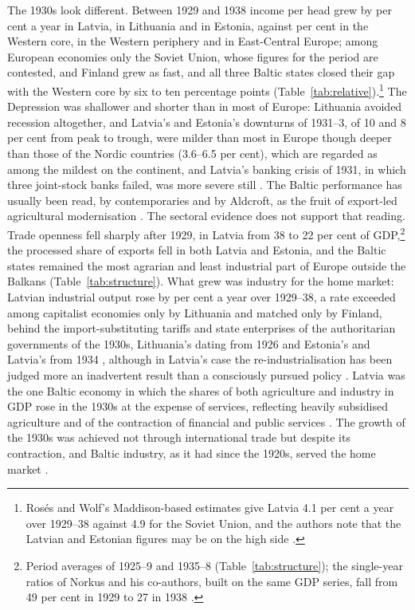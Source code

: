 The 1930s look different. Between 1929 and 1938 income per head grew by  per cent a year in Latvia,  in Lithuania and  in Estonia, against  per cent in the Western core,  in the Western periphery and  in East-Central Europe; among European economies only the Soviet Union, whose figures for the period are contested, and Finland grew as fast, and all three Baltic states closed their gap with the Western core by six to ten percentage points (Table~\ref{tab:relative}).\footnote{Rosés and Wolf's Maddison-based estimates give Latvia 4.1 per cent a year over 1929--38 against 4.9 for the Soviet Union, and the authors note that the Latvian and Estonian figures may be on the high side \parencite[188, 190]{roseswolf2010}.} The Depression was shallower and shorter than in most of Europe: Lithuania avoided recession altogether, and Latvia's and Estonia's downturns of 1931--3, of 10 and 8 per cent from peak to trough, were milder than most in Europe though deeper than those of the Nordic countries (3.6--6.5 per cent), which are regarded as among the mildest on the continent, and Latvia's banking crisis of 1931, in which three joint-stock banks failed, was more severe still \parencites[370, 372]{grytten_nordicdepression}[91]{bernankegd01}[236]{terleckaspinigai}. The Baltic performance has usually been read, by contemporaries and by Aldcroft, as the fruit of export-led agricultural modernisation \parencites[189]{balticstates1938}[119--20]{aldcrof1914}. The sectoral evidence does not support that reading. Trade openness fell sharply after 1929, in Latvia from 38 to 22 per cent of GDP,\footnote{Period averages of 1925--9 and 1935--8 (Table~\ref{tab:structure}); the single-year ratios of Norkus and his co-authors, built on the same GDP series, fall from 49 per cent in 1929 to 27 in 1938 \parencite[10]{norkus_2025_why}.} the processed share of exports fell in both Latvia and Estonia, and the Baltic states remained the most agrarian and least industrial part of Europe outside the Balkans (Table~\ref{tab:structure}). What grew was industry for the home market: Latvian industrial output rose by  per cent a year over 1929--38, a rate exceeded among capitalist economies only by Lithuania and matched only by Finland, behind the import-substituting tariffs and state enterprises of the authoritarian governments of the 1930s, Lithuania's dating from 1926 and Estonia's and Latvia's from 1934 \parencites[113--14, 116]{ehbaltics_tarvel}[134, 140]{karnups_2017_karla}, although in Latvia's case the re-industrialisation has been judged more an inadvertent result than a consciously pursued policy \parencite[11, 36]{Klimantas2024}. Latvia was the one Baltic economy in which the shares of both agriculture and industry in GDP rose in the 1930s at the expense of services, reflecting heavily subsidised agriculture \parencites[713, 835]{latvija19141945vesture}[135--6]{karnups_2017_karla} and of the contraction of financial and public services \parencite{Klimantas2024}. The growth of the 1930s was achieved not through international trade but despite its contraction, and Baltic industry, as it had since the 1920s, served the home market \parencite[188]{valge_1994_tartu}.

